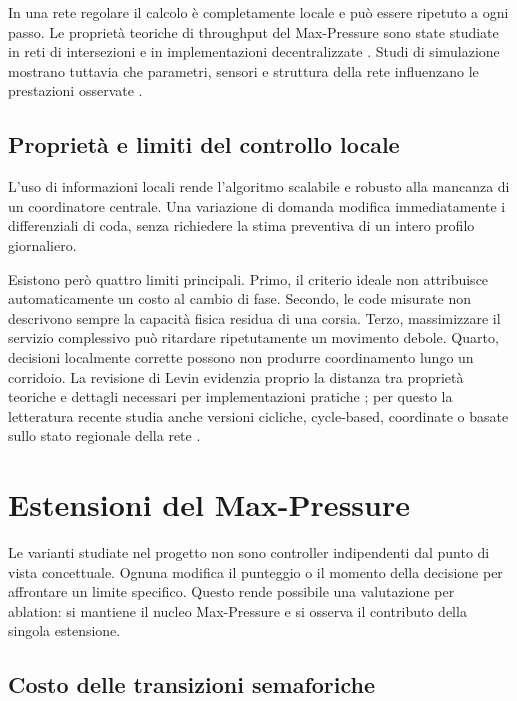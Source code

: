 \documentclass[12pt,a4paper,oneside]{report}
\numberwithin{equation}{chapter}
\begin{document}
In una rete regolare il calcolo è completamente locale e può essere ripetuto a
ogni passo. Le proprietà teoriche di throughput del Max-Pressure sono state
studiate in reti di intersezioni e in implementazioni decentralizzate
\cite{varaiya2013maxpressure,wongpiromsarn2012distributed,le2015decentralized,kouvelas2014maximum}.
Studi di simulazione mostrano tuttavia che parametri, sensori e struttura della
rete influenzano le prestazioni osservate \cite{sun2018simulation,mercader2020practical}.

\subsection{Proprietà e limiti del controllo locale}

L'uso di informazioni locali rende l'algoritmo scalabile e robusto alla
mancanza di un coordinatore centrale. Una variazione di domanda modifica
immediatamente i differenziali di coda, senza richiedere la stima preventiva di
un intero profilo giornaliero.

Esistono però quattro limiti principali. Primo, il criterio ideale non
attribuisce automaticamente un costo al cambio di fase. Secondo, le code
misurate non descrivono sempre la capacità fisica residua di una corsia.
Terzo, massimizzare il servizio complessivo può ritardare ripetutamente un
movimento debole. Quarto, decisioni localmente corrette possono non produrre
coordinamento lungo un corridoio. La revisione di Levin evidenzia proprio la
distanza tra proprietà teoriche e dettagli necessari per implementazioni
pratiche \cite{levin2023review}; per questo la letteratura recente studia
anche versioni cicliche, cycle-based, coordinate o basate sullo stato regionale
della rete \cite{anderson2018cyclebased,levin2020cyclical,xu2024smoothing,liu2024nmp}.

\section{Estensioni del Max-Pressure}

Le varianti studiate nel progetto non sono controller indipendenti dal punto di
vista concettuale. Ognuna modifica il punteggio o il momento della decisione
per affrontare un limite specifico. Questo rende possibile una valutazione per
ablation: si mantiene il nucleo Max-Pressure e si osserva il contributo della
singola estensione.

\subsection{Costo delle transizioni semaforiche}
\end{document}
